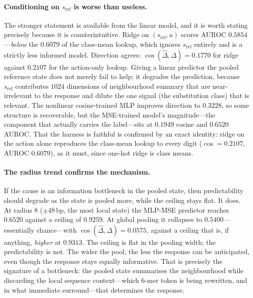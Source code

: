 \documentclass{article}
\newcommand{\sref}{s_{\mathrm{ref}}}
\newcommand{\D}{\Delta}
\newcommand{\Dhat}{\hat\Delta}
\begin{document}
\paragraph{Conditioning on $\sref$ is worse than useless.} The stronger statement is available from
the linear model, and it is worth stating precisely because it is counterintuitive. Ridge on
$(\sref,a)$ scores AUROC $0.5854$---\emph{below} the $0.6079$ of the class-mean lookup, which
ignores $\sref$ entirely and is a strictly less informed model. Direction agrees:
$\cos(\Dhat,\D)=0.1770$ for ridge against $0.2107$ for the action-only lookup. Giving a linear
predictor the pooled reference state does not merely fail to help; it degrades the prediction,
because $\sref$ contributes $1024$ dimensions of neighbourhood summary that are near-irrelevant to
the response and dilute the one signal (the substitution class) that is relevant. The nonlinear
cosine-trained MLP improves direction to $0.3228$, so some structure is recoverable, but the
MSE-trained model's magnitude---the component that actually carries the label---sits at $0.1949$
cosine and $0.6520$ AUROC. That the harness is faithful is confirmed by an exact identity: ridge on
the action alone reproduces the class-mean lookup to every digit ($\cos=0.2107$, AUROC $0.6079$),
as it must, since one-hot ridge is class means.

\paragraph{The radius trend confirms the mechanism.} If the cause is an information bottleneck in
the pooled state, then predictability should degrade as the state is pooled more, while the ceiling
stays flat. It does. At radius $8$ ($\pm48$\,bp, the most local state) the MLP-MSE predictor reaches
$0.6520$ against a ceiling of $0.9259$. At global pooling it collapses to $0.5400$---essentially
chance---with $\cos(\Dhat,\D)=0.0575$, against a ceiling that is, if anything, \emph{higher} at
$0.9313$. The ceiling is flat in the pooling width; the predictability is not. The wider the pool,
the less the response can be anticipated, even though the response stays equally informative. That
is precisely the signature of a bottleneck: the pooled state summarises the neighbourhood while
discarding the local sequence context---which $6$-mer token is being rewritten, and in what
immediate surround---that determines the response.
\end{document}
